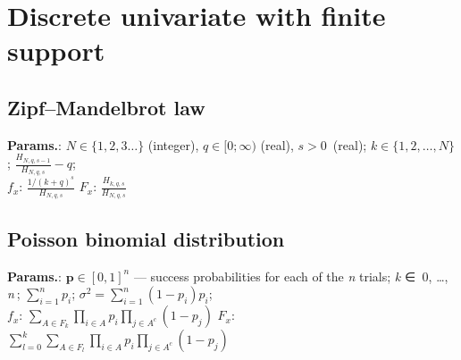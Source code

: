 











    \section{Discrete univariate with finite support}
        

        
    
        
\subsection{Zipf–Mandelbrot law}





    {\color{darkblue} \textbf{Params.}:} {$N \in \{1,2,3\ldots\}$ (integer),  $q \in [0;\infty)$ (real),  $s>0\,$ (real)}; {$k \in \{1,2,\ldots,N\}$}; {$\frac{H_{N,q,s-1}}{H_{N,q,s}}-q$};\hspace{0.5cm}\\{\color{darkblue} \textbf{$f_x$}:} {$\frac{1/(k+q)^s}{H_{N,q,s}}$}{\color{darkblue} \textbf{$F_x$}:} {$\frac{H_{k,q,s}}{H_{N,q,s}}$}



    
        
\subsection{Poisson binomial distribution}





    {\color{darkblue} \textbf{Params.}:} {$\mathbf{p}\in [0,1]^n$ — success probabilities for each of the \textit{n} trials}; {\textit{k} ∈ { 0, …, \textit{n} }}; {$\sum\limits_{i=1}^n p_i$}; {$ \sigma^2 =\sum\limits_{i=1}^n (1 - p_i)p_i$};\hspace{0.5cm}\\{\color{darkblue} \textbf{$f_x$}:} {$\sum\limits_{A\in F_k} \prod\limits_{i\in A} p_i \prod\limits_{j\in A^c} (1-p_j)$}{\color{darkblue} \textbf{$F_x$}:} {$\sum\limits_{l=0}^k \sum\limits_{A\in F_l} \prod\limits_{i\in A} p_i \prod\limits_{j\in A^c} (1-p_j)$}



